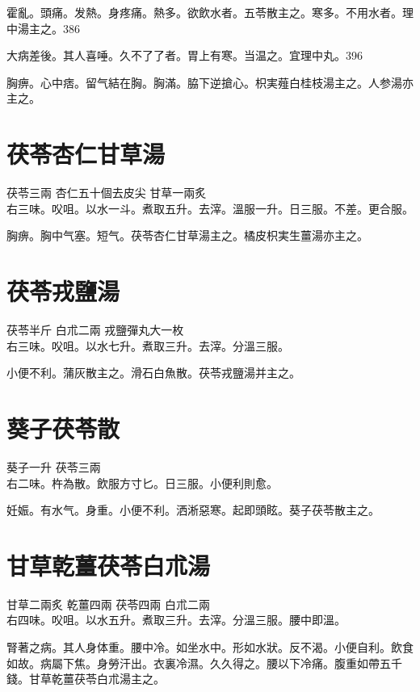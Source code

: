 \documentclass[b5paper,twoside,zihao=-4,UTF8]{ctexbook}
\begin{document}
霍亂。頭痛。发熱。身疼痛。熱多。欲飲水者。五苓散主之。寒多。不用水者。理中湯主之。386

大病差後。其人喜唾。久不了了者。胃上有寒。当温之。宜理中丸。396

胸痹。心中痞。留气結在胸。胸滿。脇下逆搶心。枳実薤白桂枝湯主之。人参湯亦主之。

\section{茯苓杏仁甘草湯}

茯苓{\scriptsize 三兩} 杏仁{\scriptsize 五十個去皮尖} 甘草{\scriptsize 一兩炙}\\
右三味。㕮咀。以水一斗。煮取五升。去滓。溫服一升。日三服。不差。更合服。

胸痹。胸中气塞。短气。茯苓杏仁甘草湯主之。橘{皮}枳{実生}薑湯亦主之。

\section{茯苓戎鹽湯}

茯苓{\scriptsize 半斤} 白朮{\scriptsize 二兩} 戎鹽{\scriptsize 彈丸大一枚}\\
右三味。㕮咀。以水七升。煮取三升。去滓。分溫三服。

小便不利。蒲灰散主之。滑石白魚散。茯苓戎鹽湯并主之。

\section{葵子茯苓散}

葵子{\scriptsize 一升} 茯苓{\scriptsize 三兩}\\
右二味。杵為散。飲服方寸匕。日三服。小便利則愈。

妊娠。有水气。身重。小便不利。洒淅惡寒。起即頭眩。葵子茯苓散主之。

\section{甘草乾薑茯苓白朮湯}

甘草{\scriptsize 二兩炙} 乾薑{\scriptsize 四兩} 茯苓{\scriptsize 四兩} 白朮{\scriptsize 二兩}\\
右四味。㕮咀。以水五升。煮取三升。去滓。分溫三服。腰中即溫。

腎著之病。其人身体重。腰中冷。如坐水中。形如水狀。反不渴。小便自利。飲食如故。病屬下焦。身勞汗出。衣裏冷濕。久久得之。腰以下冷痛。腹重如帶五千錢。甘{草乾}薑{茯}苓{白}朮湯主之。
\end{document}
